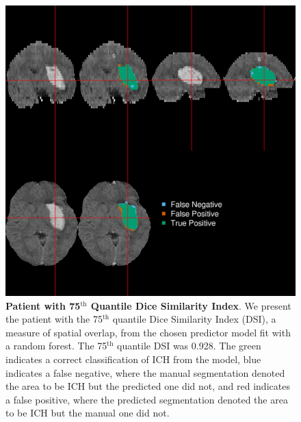 \documentclass{elsarticle_nonatbib}\usepackage[]{graphicx}\usepackage[]{color}
\begin{document}
 \begin{figure}
\centering
\includegraphics[width=0.75\linewidth,keepaspectratio]{Reseg_Figure_DSI_Quantile_075_native.png}
\caption{{\bf Patient with  75$^{\text{th}}$ Quantile Dice Similarity Index}. We present the patient with the 75$^{\text{th}}$ quantile Dice Similarity Index (DSI), a measure of spatial overlap, from the chosen predictor model fit with a random forest.  The 75$^{\text{th}}$ quantile DSI was 0.928. The green indicates a correct classification of ICH from the model, blue indicates a false negative, where the manual segmentation denoted the area to be ICH but the predicted one did not, and red indicates a false positive, where the predicted segmentation denoted the area to be ICH but the manual one did not. }
\label{fig:dice_img75}
\end{figure}
\end{document}
